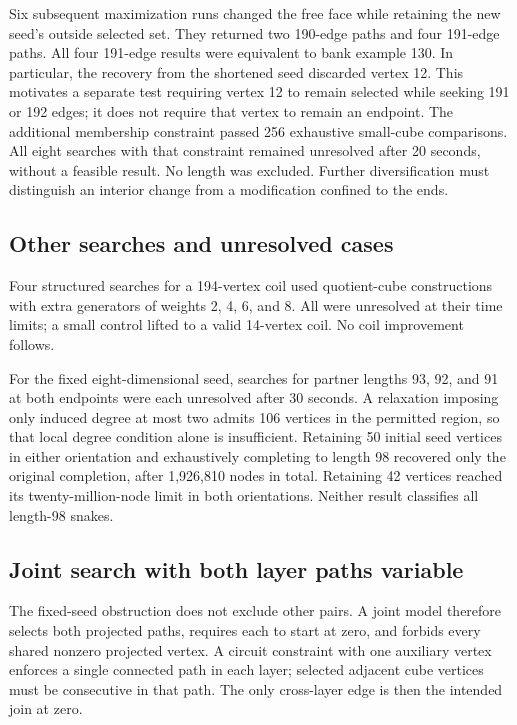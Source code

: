 \documentclass[11pt,a4paper]{article}
\theoremstyle{definition}
\theoremstyle{remark}
\begin{document}
Six subsequent maximization runs changed the free face while retaining the new seed's outside selected set. They returned two 190-edge paths and four 191-edge paths. All four 191-edge results were equivalent to bank example 130. In particular, the recovery from the shortened seed discarded vertex 12. This motivates a separate test requiring vertex 12 to remain selected while seeking 191 or 192 edges; it does not require that vertex to remain an endpoint. The additional membership constraint passed 256 exhaustive small-cube comparisons. All eight searches with that constraint remained unresolved after 20 seconds, without a feasible result. No length was excluded. Further diversification must distinguish an interior change from a modification confined to the ends.

\subsection{Other searches and unresolved cases}
Four structured searches for a 194-vertex coil used quotient-cube constructions with extra generators of weights 2, 4, 6, and 8. All were unresolved at their time limits; a small control lifted to a valid 14-vertex coil. No coil improvement follows.

For the fixed eight-dimensional seed, searches for partner lengths 93, 92, and 91 at both endpoints were each unresolved after 30 seconds. A relaxation imposing only induced degree at most two admits 106 vertices in the permitted region, so that local degree condition alone is insufficient. Retaining 50 initial seed vertices in either orientation and exhaustively completing to length 98 recovered only the original completion, after 1,926,810 nodes in total. Retaining 42 vertices reached its twenty-million-node limit in both orientations. Neither result classifies all length-98 snakes.

\subsection{Joint search with both layer paths variable}
The fixed-seed obstruction does not exclude other pairs. A joint model therefore selects both projected paths, requires each to start at zero, and forbids every shared nonzero projected vertex. A circuit constraint with one auxiliary vertex enforces a single connected path in each layer; selected adjacent cube vertices must be consecutive in that path. The only cross-layer edge is then the intended join at zero.
\end{document}
